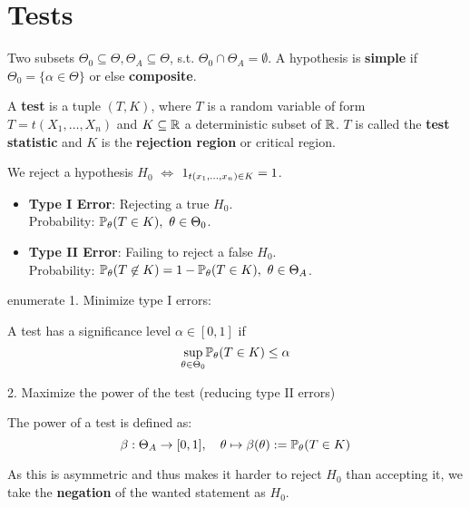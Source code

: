 \section{Tests}
\begin{definition*}
  Two subsets \(\Theta_0 \subseteq \Theta, \Theta_A \subseteq \Theta\), s.t. \(\Theta_0 \cap \Theta_A = \emptyset\). A hypothesis is \textbf{simple} if \(\Theta_0 = \{\alpha \in \Theta\}\) or else \textbf{composite}.
\end{definition*}

\begin{definition*}[Test]
  A \textbf{test} is a tuple \((T, K)\), where \(T\) is a random variable of form \(T = t(X_1, \ldots, X_n)\) and \(K \subseteq \R\) a deterministic subset of \(\R\). \(T\) is called the \textbf{test statistic} and \(K\) is the \textbf{rejection region} or critical region. 
\end{definition*}

We reject a hypothesis \(H_0\) \(\iff\) \(\I_{t(x_1, \ldots, x_n) \in K} = 1\).

\begin{definition*}
  \begin{itemize}
    \item \textbf{Type I Error}: Rejecting a true \(H_0\). \\
    Probability: \(\P_\theta(T \in K), \ \theta \in \Theta_0\).
    \item \textbf{Type II Error}: Failing to reject a false \(H_0\). \\
    Probability: \(\P_\theta(T \not\in K) = 1 - \P_\theta(T \in K), \ \theta \in \Theta_A\).
  \end{itemize}
\end{definition*}enumerate
1. Minimize type I errors:
\begin{definition*}
  A test has a significance level \(\alpha \in [0, 1]\) if
  \[\underset{\theta \in \Theta_0}{\sup} \P_\theta(T \in K) \leq \alpha\]
\end{definition*}

2. Maximize the power of the test (reducing type II errors)
\begin{definition*}
  The power of a test is defined as:
  \[\beta: \Theta_A \to [0, 1], \quad \theta \mapsto \beta(\theta) := \P_\theta(T \in K)\]
\end{definition*}

As this is asymmetric and thus makes it harder to reject \(H_0\) than accepting it, we take the \textbf{negation} of the wanted statement as \(H_0\).


